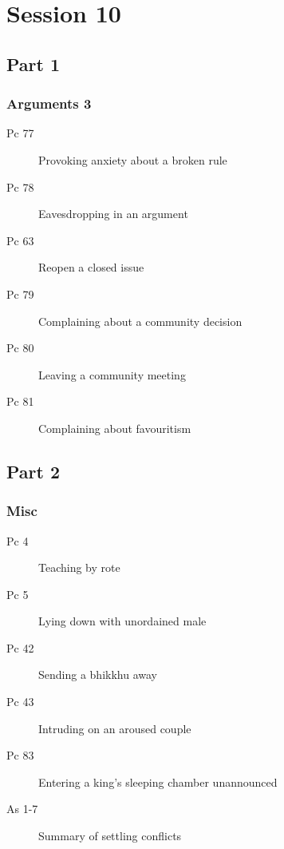 \documentclass[11pt,oneside]{memoir}
\begin{document}
\chapter{Session 10}

\begin{multicols}{2}

\section{Part 1}

\subsection{Arguments 3}

\begin{description}
\item[Pc 77] Provoking anxiety about a broken rule
\item[Pc 78] Eavesdropping in an argument
\item[Pc 63] Reopen a closed issue
\item[Pc 79] Complaining about a community decision
\item[Pc 80] Leaving a community meeting
\item[Pc 81] Complaining about favouritism
\end{description}

\columnbreak

\section{Part 2}

\subsection{Misc}

\begin{description}
\item[Pc 4] Teaching by rote
\item[Pc 5] Lying down with unordained male
\item[Pc 42] Sending a bhikkhu away
\item[Pc 43] Intruding on an aroused couple
\item[Pc 83] Entering a king's sleeping chamber unannounced
\item[As 1-7] Summary of settling conflicts
\end{description}

\end{multicols}
\end{document}
